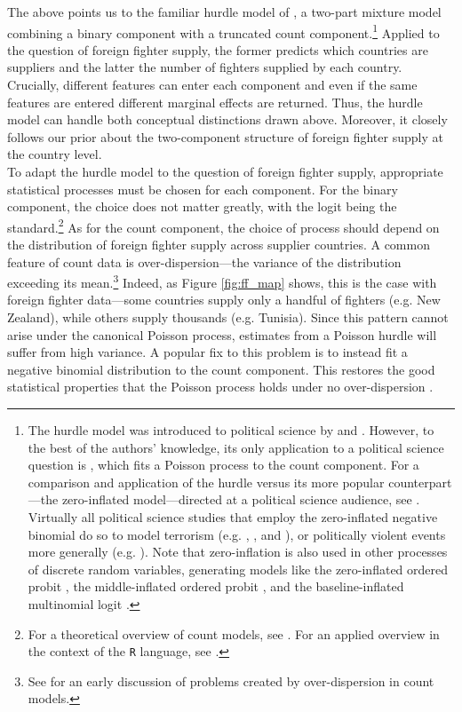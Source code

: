 \documentclass[12pt]{article}
\begin{document}
The above points us to the familiar hurdle model of \cite{Mullahy1986}, a two-part mixture model combining a binary component with a truncated count component.\footnote{The hurdle model was introduced to political science by \cite{King1989} and \cite{King1989a}. However, to the best of the authors' knowledge, its only application to a political science question is \cite{Marschall2010}, which fits a Poisson process to the count component. For a comparison and application of the hurdle versus its more popular counterpart---the zero-inflated model---directed at a political science audience, see \cite{Zorn1998}. Virtually all political science studies that employ the zero-inflated negative binomial do so to model terrorism (e.g. \cite{Li2005}, \cite{Burgoon2006}, and \cite{Wilson2013}), or politically violent events more generally (e.g. \cite{Bagozzi2015}). Note that zero-inflation is also used in other processes of discrete random variables, generating models like the zero-inflated ordered probit \citep{Bagozzi2015a}, the middle-inflated ordered probit \citep{Bagozzi2012}, and the baseline-inflated multinomial logit \citep{Bagozzi2015b, Bagozzi2015c}.} Applied to the question of foreign fighter supply, the former predicts which countries are suppliers and the latter the number of fighters supplied by each country. Crucially, different features can enter each component and even if the same features are entered different marginal effects are returned. Thus, the hurdle model can handle both conceptual distinctions drawn above. Moreover, it closely follows our prior about the two-component structure of foreign fighter supply at the country level.	\\

To adapt the hurdle model to the question of foreign fighter supply, appropriate statistical processes must be chosen for each component. For the binary component, the choice does not matter greatly, with the logit being the standard.\footnote{For a theoretical overview of count models, see \cite{Cameron2013}. For an applied overview in the context of the \texttt{R}  language, see \cite{Zeileis2007}.} As for the count component, the choice of process should depend on the distribution of foreign fighter supply across supplier countries. A common feature of count data is over-dispersion---the variance of the distribution exceeding its mean.\footnote{See \cite{Cox1983} for an early discussion of problems created by over-dispersion in count models.} Indeed, as Figure \ref{fig:ff_map} shows, this is the case with foreign fighter data---some countries supply only a handful of fighters (e.g. New Zealand), while others supply thousands (e.g. Tunisia). Since this pattern cannot arise under the canonical Poisson process, estimates from a Poisson hurdle will suffer from high variance. A popular fix to this problem is to instead fit a negative binomial distribution to the count component. This restores the good statistical properties that the Poisson process holds under no over-dispersion \citep{Lawless1987}. 	\\
\end{document}
